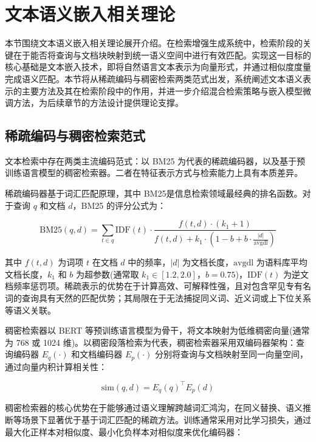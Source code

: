 \documentclass[promaster, vlined]{DissertUESTC}
\begin{document}
\section{文本语义嵌入相关理论}

本节围绕文本语义嵌入相关理论展开介绍。在检索增强生成系统中，检索阶段的关键在于能否将查询与文档块映射到统一语义空间中进行有效匹配。实现这一目标的核心基础是文本嵌入技术，即将自然语言文本表示为向量形式，并通过相似度度量完成语义匹配。本节将从稀疏编码与稠密检索两类范式出发，系统阐述文本语义表示的主要方法及其在检索阶段中的作用，并进一步介绍混合检索策略与嵌入模型微调方法，为后续章节的方法设计提供理论支撑。

\subsection{稀疏编码与稠密检索范式}

文本检索中存在两类主流编码范式：以 BM25 为代表的稀疏编码器，以及基于预训练语言模型的稠密检索器\cite{lewis2020retrieval}。二者在特征表示方式与检索能力上具有本质差异。

稀疏编码器基于词汇匹配原理，其中 BM25是信息检索领域最经典的排名函数\cite{robertson2009probabilistic}。对于查询 $q$ 和文档 $d$，BM25 的评分公式为：

\begin{equation}
\text{BM25}(q, d) = \sum_{t \in q} \text{IDF}(t) \cdot \frac{f(t,d) \cdot (k_1+1)}{f(t,d) + k_1 \cdot \left(1 - b + b \cdot \frac{|d|}{\text{avgdl}}\right)}
\end{equation}

其中 $f(t,d)$ 为词项 $t$ 在文档 $d$ 中的频率，$|d|$ 为文档长度，$\text{avgdl}$ 为语料库平均文档长度，$k_1$ 和 $b$ 为超参数(通常取 $k_1 \in [1.2, 2.0]$，$b=0.75$)，$\text{IDF}(t)$ 为逆文档频率惩罚项。稀疏表示的优势在于计算高效、可解释性强，且对包含罕见专有名词的查询具有天然的匹配优势；其局限在于无法捕捉同义词、近义词或上下位关系等语义关联。

稠密检索器以 BERT 等预训练语言模型为骨干，将文本映射为低维稠密向量(通常为 768 或 1024 维)\cite{karpukhin2020dense}。以稠密段落检索为代表，稠密检索器采用双编码器架构：查询编码器 $E_q(\cdot)$ 和文档编码器 $E_p(\cdot)$ 分别将查询与文档映射至同一向量空间，通过向量内积计算相关性：

\begin{equation}
\text{sim}(q, d) = E_q(q)^\top E_p(d)
\end{equation}

稠密检索器的核心优势在于能够通过语义理解跨越词汇鸿沟，在同义替换、语义推断等场景下显著优于基于词汇匹配的稀疏方法。训练通常采用对比学习损失，通过最大化正样本对相似度、最小化负样本对相似度来优化编码器：
\end{document}
